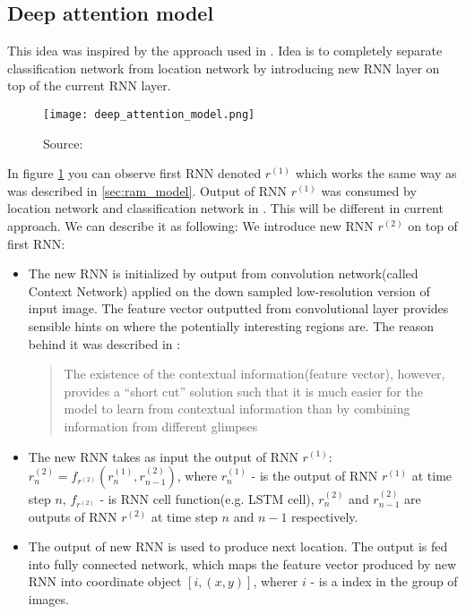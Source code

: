 \subsection{Deep attention model}
\label{subs:deep_att_model}
This idea was inspired by the approach used in \cite{DBLP:journals/corr/BaMK14}.
Idea is to completely separate classification network from location network
by introducing new RNN layer on top of the current RNN layer.

\begin{figure}
	\texttt{[image: deep\_attention\_model.png]}
	\caption{Source: \cite{DBLP:journals/corr/BaMK14}}
	\label{fig:deep_att_model}
\end{figure}

In figure \ref{fig:deep_att_model} you can observe first RNN denoted $r^{(1)}$ which works
the same way as was described in \autoref{sec:ram_model}. Output of RNN $r^{(1)}$
was consumed by location network and classification network in \cite{DBLP:journals/corr/MnihHGK14}.
This will be different in current approach. We can describe it as following:
We introduce new RNN $r^{(2)}$ on top of first RNN:
\begin{itemize}
	\item The new RNN is initialized by output from convolution
		network(called Context Network) applied on the down
		sampled low-resolution version of input image.
		The feature vector outputted from convolutional layer
		provides sensible hints on where
		the potentially interesting regions are.
		The reason behind it was described in \cite{DBLP:journals/corr/BaMK14}:
		\blockquote{The existence of the contextual information(feature vector),
		however, provides a
		“short cut” solution such that it is much easier for the model to
		learn from contextual information than by combining information
		from different glimpses}
	\item The new RNN takes as input the output of RNN $r^{(1)}$:
		$r_n^{(2)} = f_{r^{(2)}}(r_n^{(1)}, r_{n-1}^{(2)})$,
		where $r_n^{(1)}$ - is the output of RNN $r^{(1)}$ at time step $n$,
		$f_{r^{(2)}}$ - is RNN cell function(e.g. LSTM cell),
		  $r_n^{(2)}$ and $r_{n-1}^{(2)}$ are outputs of RNN $r^{(2)}$
		  at time step $n$ and $n-1$ respectively.
	\item The output of new RNN is used to produce next location.
		The output is fed into fully connected network, which maps
		the feature vector produced by new RNN into coordinate object $[i, (x,y)]$,
		wherer $i$ - is a index in the group of images.
\end{itemize}

